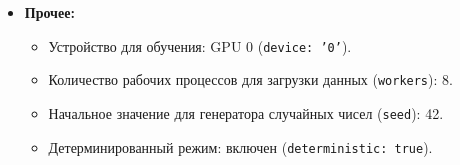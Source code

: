 \documentclass[12pt, a4paper]{article}
\theoremstyle{definition}
\theoremstyle{remark}
\begin{document}
\begin{itemize}
\begin{itemize}
			\item Геометрические преобразования:
			\begin{itemize}
				\item Повороты (\texttt{degrees}): 0 (отключены в данном конфиге, но \texttt{randaugment} может применять).
				\item Сдвиг (\texttt{translate}): 0.1.
				\item Масштабирование (\texttt{scale}): 0.5.
				\item Сдвиг с наклоном (\texttt{shear}): 0.0.
				\item Перспектива (\texttt{perspective}): 0.0.
			\end{itemize}
			\item Горизонтальное отражение (\texttt{fliplr}): вероятность 0.5.
			\item Вертикальное отражение (\texttt{flipud}): вероятность 0.0.
			\item Аугментация Mosaic: вероятность 1.0.
			\item Аугментация MixUp: вероятность 0.0 (отключена).
			\item Случайное стирание (\texttt{erasing}): вероятность 0.4.
			\item Copy-Paste аугментация: вероятность 0.0 (отключена).
		\end{itemize}
		\item \textbf{Прочее:}
		\begin{itemize}
			\item Устройство для обучения: GPU 0 (\texttt{device: '0'}).
			\item Количество рабочих процессов для загрузки данных (\texttt{workers}): 8.
			\item Начальное значение для генератора случайных чисел (\texttt{seed}): 42.
			\item Детерминированный режим: включен (\texttt{deterministic: true}).
		\end{itemize}
	\end{itemize}
	
\end{document}
